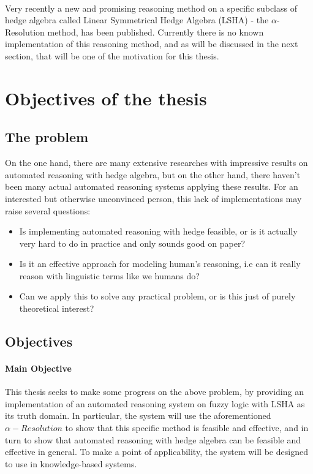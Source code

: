 \documentclass[../gr-final.tex]{subfiles}
\begin{document}
\paragraph{}
Very recently a new and promising reasoning method on a specific
subclass of hedge algebra called Linear Symmetrical Hedge Algebra
(LSHA) - the $\alpha$-Resolution method, has been published.
Currently there is no known implementation of this reasoning
method, and as will be discussed in the next section, that will
be one of the motivation for this thesis.

\section{Objectives of the thesis}
\subsection{The problem} On the one hand, there are many extensive researches with
impressive results on automated reasoning with hedge algebra, but
on the other hand, there haven't been many actual automated
reasoning systems applying these results. For an interested but
otherwise unconvinced person, this lack of implementations may raise several
questions: 
\begin{itemize}
        \item Is implementing automated reasoning with hedge
                feasible, or is it actually very hard to do in
                practice and only sounds good on paper?
        \item Is it an effective approach for modeling
                human's reasoning, i.e can it really reason with
                linguistic terms like we humans do?
        \item Can we apply this to solve any practical problem,
                or is this just of purely theoretical interest?
\end{itemize}
\subsection{Objectives}
\paragraph{Main Objective} This thesis seeks to make some progress
on the above problem, by
providing an implementation of an automated reasoning system on
fuzzy logic with LSHA as its truth domain. In particular,
the system will use the aforementioned $\alpha-Resolution$ to show that
this specific method is feasible and effective, and in turn to
show that automated reasoning with hedge algebra can be feasible
and effective in general. To make a point of
applicability, the system will be designed to use in
knowledge-based systems.\\\\
\end{document}
